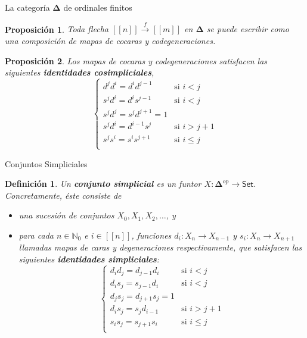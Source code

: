 \documentclass[11pt]{beamer}
\newcommand{\N}{\mathbb{N}}
\newcommand{\nat}[1]{[\![#1]\!]}
\newcommand{\ord}[1]{\nat{#1}}
\newcommand{\cat}[1]{\mathsf{#1}}
\newcommand{\ordcat}{\boldsymbol{\Delta}}
\newtheorem{defs}{Definición}
\newtheorem{prop}{Proposición}
\begin{document}
\begin{frame}{La categoría $\ordcat$ de ordinales finitos}
\begin{prop} Toda flecha $\ord{n} \xrightarrow{f} \ord{m}$ en $\ordcat$ se puede escribir como una composición de mapas de cocaras y codegeneraciones.
\end{prop}

\begin{prop} Los mapas de cocaras y codegeneraciones satisfacen las siguientes \textbf{identidades cosimpliciales},
\[
\begin{cases}
d^jd^i = d^id^{j-1} &\text{si $i < j$}\\
s^jd^i = d^is^{j-1} &\text{si $i < j$}\\
s^jd^j = s^jd^{j+1} = 1\\
s^jd^i = d^{i-1}s^j &\text{si $i > j+1$}\\
s^js^i = s^is^{j+1} &\text{si $i \leq j$}\\
\end{cases}
\]
\end{prop}
\end{frame}

\begin{frame}{Conjuntos Simpliciales}

\begin{defs} Un \textbf{conjunto simplicial} es un funtor $X : \ordcat^{op} \to \cat{Set}$. Concretamente, éste consiste de 
\begin{itemize}
\item[(i)] una sucesión de conjuntos $X_0,X_1,X_2, \dots$, y \item[(ii)] para cada $n \in \N_0$ e $i \in \ord{n}$, funciones 
$d_i : X_n \to X_{n-1}$ y $s_i : X_n \to X_{n+1}$ llamadas mapas de caras y degeneraciones respectivamente, que satisfacen las siguientes \textbf{identidades simpliciales}:
\[
\begin{cases}
d_id_j = d_{j-1}d_i &\text{si $i < j$}\\
d_is_j = s_{j-1}d_i &\text{si $i < j$}\\
d_js_j = d_{j+1}s_j = 1\\
d_is_j = s_jd_{i-1} &\text{si $i > j+1$}\\
s_is_j = s_{j+1}s_i &\text{si $i \leq j$}\\
\end{cases}
\] 
\end{itemize}
\end{defs}
\end{frame}
\end{document}
